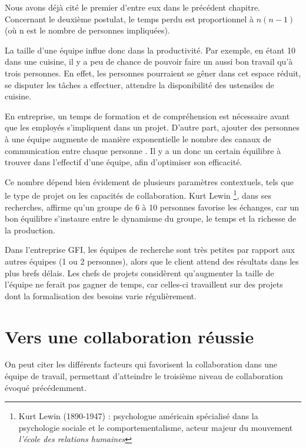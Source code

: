 Nous avons déjà cité le premier d'entre eux dans le précédent chapitre. Concernant le deuxième postulat, le temps perdu est proportionnel à $ n(n-1) $ (où n est le nombre de personnes impliquées).

La taille d'une équipe influe donc dans la productivité. Par exemple, en étant 10 dans une cuisine, il y a peu de chance de pouvoir faire un aussi bon travail qu'à trois personnes. En effet, les personnes pourraient se gêner dans cet espace réduit, se disputer les tâches a effectuer, attendre la disponibilité des ustensiles de cuisine.

En entreprise, un temps de formation et de compréhension est nécessaire avant que les employés s'impliquent dans un projet. D'autre part, ajouter des personnes à une équipe augmente de manière exponentielle le nombre des canaux de communication entre chaque personne . Il y a un donc un certain équilibre à trouver dans l'effectif d'une équipe, afin d'optimiser son efficacité.

Ce nombre dépend bien évidement de plusieurs paramètres contextuels, tels que le type de projet ou les capacités de collaboration. Kurt Lewin \footnote{Kurt Lewin (1890-1947) : psychologue américain spécialisé dans la psychologie sociale et le comportementalisme, acteur majeur du mouvement \textit{l'école des relations humaines}}, dans ses recherches, affirme qu'un groupe de 6 à 10 personnes favorise les échanges, car un bon équilibre s'instaure entre le dynamisme du groupe, le temps et la richesse de la production.


\begin{app}
Dans l'entreprise GFI, les équipes de recherche sont très petites par rapport aux autres équipes (1 ou 2 personnes), alors que le client attend des résultats dans les plus brefs délais. Les chefs de projets considèrent qu'augmenter la taille de l'équipe ne ferait pas gagner de temps, car celles-ci travaillent sur des projets dont la formalisation des besoins varie régulièrement.
\end{app}

\section{Vers une collaboration réussie}

On peut citer les différents facteurs qui favorisent la collaboration dans une équipe de travail, permettant d'atteindre le troisième niveau de collaboration évoqué précédemment.

